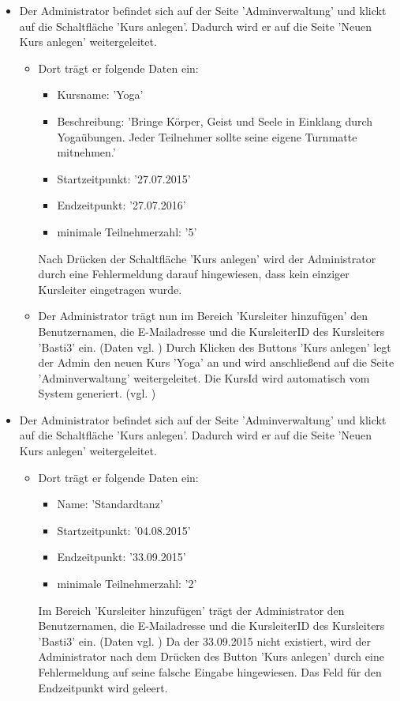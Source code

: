 \documentclass[a4paper]{scrreprt}
\begin{document}
\begin{itemize}
				\item {}
			 	 Der Administrator befindet sich auf der Seite 'Adminverwaltung' und klickt auf die Schaltfläche 'Kurs anlegen'. Dadurch wird er auf die Seite 'Neuen Kurs anlegen' weitergeleitet.
				 	 \begin{itemize} 
					 	 \item Dort trägt er folgende Daten ein:
							\begin{itemize}
								\item Kursname: 'Yoga'
								\item Beschreibung: 'Bringe Körper, Geist und Seele in Einklang durch Yogaübungen. Jeder Teilnehmer sollte seine eigene Turnmatte mitnehmen.'
								\item Startzeitpunkt: '27.07.2015'
								\item Endzeitpunkt: '27.07.2016'
								\item minimale Teilnehmerzahl: '5'
							\end{itemize}
							Nach Drücken der Schaltfläche 'Kurs anlegen' wird der Administrator durch eine Fehlermeldung darauf hingewiesen, dass kein einziger Kursleiter eingetragen wurde.
							
						 \item Der Administrator trägt nun im Bereich 'Kursleiter hinzufügen' den Benutzernamen, die E-Mailadresse und die KursleiterID des Kursleiters 'Basti3' ein. (Daten vgl. ) Durch Klicken des Buttons 'Kurs anlegen' legt der Admin den neuen Kurs 'Yoga' an und wird anschließend auf die Seite 'Adminverwaltung' weitergeleitet. Die KursId wird automatisch vom System generiert. (vgl. )
					\end{itemize}
					
				\item {}
				 Der Administrator befindet sich auf der Seite 'Adminverwaltung' und klickt auf die Schaltfläche 'Kurs anlegen'. Dadurch wird er auf die Seite 'Neuen Kurs anlegen' weitergeleitet.
					 \begin{itemize}
						\item Dort trägt er folgende Daten ein:
							\begin{itemize}
								\item Name: 'Standardtanz'
								\item Startzeitpunkt: '04.08.2015'
								\item Endzeitpunkt: '33.09.2015'
								\item minimale Teilnehmerzahl: '2'
							\end{itemize}
						Im Bereich 'Kursleiter hinzufügen' trägt der Administrator den Benutzernamen, die E-Mailadresse und die KursleiterID des Kursleiters 'Basti3' ein. (Daten vgl. ) Da der 33.09.2015 nicht existiert, wird der Administrator nach dem Drücken des Button 'Kurs anlegen' durch eine Fehlermeldung auf seine falsche Eingabe hingewiesen. Das Feld für den Endzeitpunkt wird geleert. 
						

\end{itemize}
\end{itemize}
\end{document}
